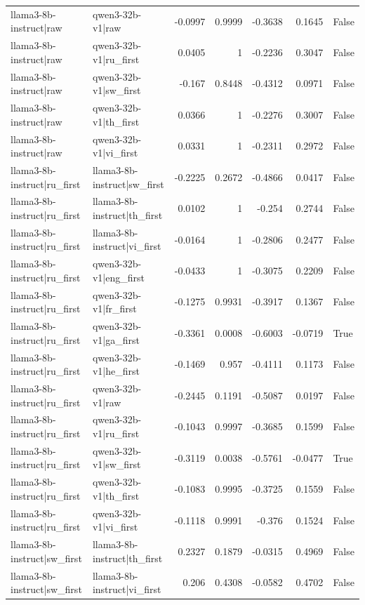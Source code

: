 \begin{table}
\begin{tabular}{l l r r r r l}
llama3-8b-instruct|raw & qwen3-32b-v1|raw & -0.0997 & 0.9999 & -0.3638 & 0.1645 & False \\
llama3-8b-instruct|raw & qwen3-32b-v1|ru_first & 0.0405 & 1 & -0.2236 & 0.3047 & False \\
llama3-8b-instruct|raw & qwen3-32b-v1|sw_first & -0.167 & 0.8448 & -0.4312 & 0.0971 & False \\
llama3-8b-instruct|raw & qwen3-32b-v1|th_first & 0.0366 & 1 & -0.2276 & 0.3007 & False \\
llama3-8b-instruct|raw & qwen3-32b-v1|vi_first & 0.0331 & 1 & -0.2311 & 0.2972 & False \\
llama3-8b-instruct|ru_first & llama3-8b-instruct|sw_first & -0.2225 & 0.2672 & -0.4866 & 0.0417 & False \\
llama3-8b-instruct|ru_first & llama3-8b-instruct|th_first & 0.0102 & 1 & -0.254 & 0.2744 & False \\
llama3-8b-instruct|ru_first & llama3-8b-instruct|vi_first & -0.0164 & 1 & -0.2806 & 0.2477 & False \\
llama3-8b-instruct|ru_first & qwen3-32b-v1|eng_first & -0.0433 & 1 & -0.3075 & 0.2209 & False \\
llama3-8b-instruct|ru_first & qwen3-32b-v1|fr_first & -0.1275 & 0.9931 & -0.3917 & 0.1367 & False \\
llama3-8b-instruct|ru_first & qwen3-32b-v1|ga_first & -0.3361 & 0.0008 & -0.6003 & -0.0719 & True \\
llama3-8b-instruct|ru_first & qwen3-32b-v1|he_first & -0.1469 & 0.957 & -0.4111 & 0.1173 & False \\
llama3-8b-instruct|ru_first & qwen3-32b-v1|raw & -0.2445 & 0.1191 & -0.5087 & 0.0197 & False \\
llama3-8b-instruct|ru_first & qwen3-32b-v1|ru_first & -0.1043 & 0.9997 & -0.3685 & 0.1599 & False \\
llama3-8b-instruct|ru_first & qwen3-32b-v1|sw_first & -0.3119 & 0.0038 & -0.5761 & -0.0477 & True \\
llama3-8b-instruct|ru_first & qwen3-32b-v1|th_first & -0.1083 & 0.9995 & -0.3725 & 0.1559 & False \\
llama3-8b-instruct|ru_first & qwen3-32b-v1|vi_first & -0.1118 & 0.9991 & -0.376 & 0.1524 & False \\
llama3-8b-instruct|sw_first & llama3-8b-instruct|th_first & 0.2327 & 0.1879 & -0.0315 & 0.4969 & False \\
llama3-8b-instruct|sw_first & llama3-8b-instruct|vi_first & 0.206 & 0.4308 & -0.0582 & 0.4702 & False \\

\end{tabular}
\end{table}

